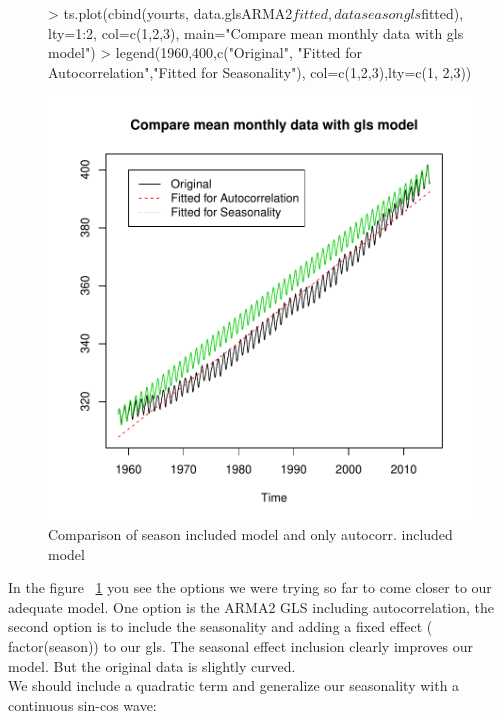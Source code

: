 \documentclass[11pt, a4paper]{article} %
\begin{document}
\begin{figure}[H]
\centering
\begin{Schunk}
\begin{Sinput}
> ts.plot(cbind(yourts, data.glsARMA2$fitted,dataseasongls$fitted),
         lty=1:2, col=c(1,2,3), main="Compare mean monthly data with gls model")
> legend(1960,400,c("Original", "Fitted for Autocorrelation","Fitted for Seasonality"),
        col=c(1,2,3),lty=c(1, 2,3))
\end{Sinput}
\end{Schunk}
\includegraphics{alleselena-036}
\caption{Comparison of season included model and only autocorr. included model}
\label{compseas}
\end{figure}

In the figure ~\ref{compseas} you see the options we were trying so far to come closer to our adequate model. One option is the ARMA2 GLS including autocorrelation, the second option is to include the seasonality and adding a fixed effect ( factor(season)) to our gls. 
The seasonal effect inclusion clearly improves our model. But the original data is slightly curved. \\

We should include a quadratic term and generalize our seasonality with a continuous sin-cos wave:\\
\end{document}
